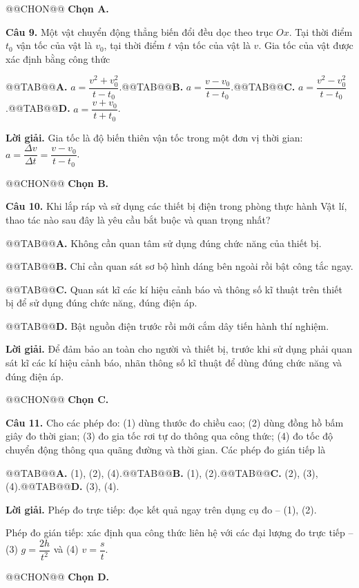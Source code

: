 \documentclass{article}
\begin{document}
@@CHON@@ \textbf{Chọn A.}

\textbf{Câu 9.} Một vật chuyển động thẳng biến đổi đều dọc theo trục $Ox$. Tại thời điểm $t_0$ vận tốc của vật là $v_0$, tại thời điểm $t$ vận tốc của vật là $v$. Gia tốc của vật được xác định bằng công thức

@@TAB@@\textbf{A.} $a = \dfrac{v^2 + v_0^2}{t - t_0}$.@@TAB@@\textbf{B.} $a = \dfrac{v - v_0}{t - t_0}$.@@TAB@@\textbf{C.} $a = \dfrac{v^2 - v_0^2}{t - t_0}$.@@TAB@@\textbf{D.} $a = \dfrac{v + v_0}{t + t_0}$.

\textbf{Lời giải.} Gia tốc là độ biến thiên vận tốc trong một đơn vị thời gian: $a = \dfrac{\Delta v}{\Delta t} = \dfrac{v - v_0}{t - t_0}$.

@@CHON@@ \textbf{Chọn B.}

\textbf{Câu 10.} Khi lắp ráp và sử dụng các thiết bị điện trong phòng thực hành Vật lí, thao tác nào sau đây là yêu cầu bắt buộc và quan trọng nhất?

@@TAB@@\textbf{A.} Không cần quan tâm sử dụng đúng chức năng của thiết bị.

@@TAB@@\textbf{B.} Chỉ cần quan sát sơ bộ hình dáng bên ngoài rồi bật công tắc ngay.

@@TAB@@\textbf{C.} Quan sát kĩ các kí hiệu cảnh báo và thông số kĩ thuật trên thiết bị để sử dụng đúng chức năng, đúng điện áp.

@@TAB@@\textbf{D.} Bật nguồn điện trước rồi mới cắm dây tiến hành thí nghiệm.

\textbf{Lời giải.} Để đảm bảo an toàn cho người và thiết bị, trước khi sử dụng phải quan sát kĩ các kí hiệu cảnh báo, nhãn thông số kĩ thuật để dùng đúng chức năng và đúng điện áp.

@@CHON@@ \textbf{Chọn C.}

\textbf{Câu 11.} Cho các phép đo: (1) dùng thước đo chiều cao; (2) dùng đồng hồ bấm giây đo thời gian; (3) đo gia tốc rơi tự do thông qua công thức; (4) đo tốc độ chuyển động thông qua quãng đường và thời gian. Các phép đo gián tiếp là

@@TAB@@\textbf{A.} (1), (2), (4).@@TAB@@\textbf{B.} (1), (2).@@TAB@@\textbf{C.} (2), (3), (4).@@TAB@@\textbf{D.} (3), (4).

\textbf{Lời giải.} Phép đo trực tiếp: đọc kết quả ngay trên dụng cụ đo -- (1), (2).

Phép đo gián tiếp: xác định qua công thức liên hệ với các đại lượng đo trực tiếp -- (3) $g = \dfrac{2h}{t^2}$ và (4) $v = \dfrac{s}{t}$.

@@CHON@@ \textbf{Chọn D.}
\end{document}
